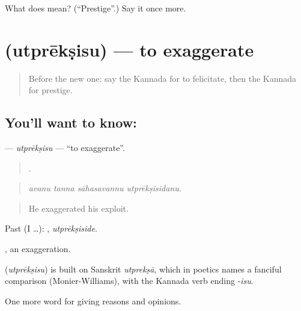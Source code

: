 \begin{tcolorbox}[breakable,colback=teal!4,colframe=teal!35!black,title={Before you move on}]
What does  mean? (\textquotedblleft{}Prestige\textquotedblright{}.) Say it once more.
\end{tcolorbox}
\section[\texorpdfstring{\kn{ಉತ್ಪ್ರೇಕ್ಷಿಸು} (utprēkṣisu)}{ಉತ್ಪ್ರೇಕ್ಷಿಸು (utprēkṣisu)}]{ (utprēkṣisu) — to exaggerate}

\label{lesson:KA-C389-utpreksisu}



\begin{quote}
Before the new one: say the Kannada for to felicitate, then the Kannada for prestige.
\end{quote}

\subsection*{You'll want to know: }
\textbf{} — \emph{utprēkṣisu} — \textquotedblleft{}to exaggerate\textquotedblright{}.

\begin{quote}
   .
\end{quote}

\begin{quote}
\emph{avanu tanna sāhasavannu utprēkṣisidanu.}
\end{quote}

\begin{quote}
He exaggerated his exploit.
\end{quote}

Past (I …): , \emph{utprēkṣiside}.

, an exaggeration.

\begin{cousinweb}
\textbf{} (\emph{utprēkṣisu}) is built on Sanskrit \emph{utprekṣā}, which in poetics names a fanciful comparison (Monier-Williams), with the Kannada verb ending -\emph{isu}.
\end{cousinweb}

\begin{grammarlens}[title={What you've built}]
One more word for giving reasons and opinions.
\end{grammarlens}


